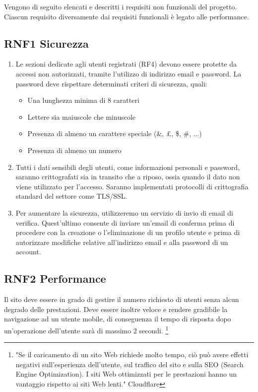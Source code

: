 \documentclass[a4paper,12pt]{article}
\begin{document}
Vengono di seguito elencati e descritti i requisiti non funzionali del progetto. Ciascun requisito diversamente dai requisiti funzionali è legato alle performance.

\subsection*{RNF1 Sicurezza}
\begin{enumerate}[label = \alph*]
    \item Le sezioni dedicate agli utenti registrati (RF4) devono essere protette da accessi non autorizzati, tramite l’utilizzo di indirizzo email e password. 
    La password deve rispettare determinati criteri di sicurezza, quali: 
        \begin{itemize}
            \item Una lunghezza minima di 8 caratteri
            \item Lettere sia maiuscole che minuscole
            \item Presenza di almeno un carattere speciale (\&, £, \$, \#, ...)
            \item Presenza di almeno un numero 
        \end{itemize}
    \item Tutti i dati sensibili degli utenti, come informazioni personali e password, saranno crittografati sia in transito che a riposo, ossia quando il dato non viene utilizzato per l'accesso. Saranno implementati protocolli di crittografia standard del settore come TLS/SSL.
    \item Per aumentare la sicurezza, utilizzeremo un servizio di invio di email di verifica. Quest'ultimo consente di inviare un'email di conferma prima di procedere con la creazione o l'eliminazione di un profilo utente e prima di autorizzare modifiche relative all'indirizzo email e alla password di un account. 
\end{enumerate}


\subsection*{RNF2 Performance}
Il sito deve essere in grado di gestire il numero richiesto di utenti senza alcun degrado delle prestazioni. Deve essere inoltre veloce e rendere gradibile la navigazione ad un utente mobile, di conseguenza il tempo di risposta dopo un'operazione dell'utente sarà di massimo 2 secondi. \footnote{"Se il caricamento di un sito Web richiede molto tempo, ciò può avere effetti negativi sull'esperienza dell'utente, sul traffico del sito e sulla SEO (Search Engine Optimization). I siti Web ottimizzati per le prestazioni hanno un vantaggio rispetto ai siti Web lenti."    Cloudflare }
\end{document}
